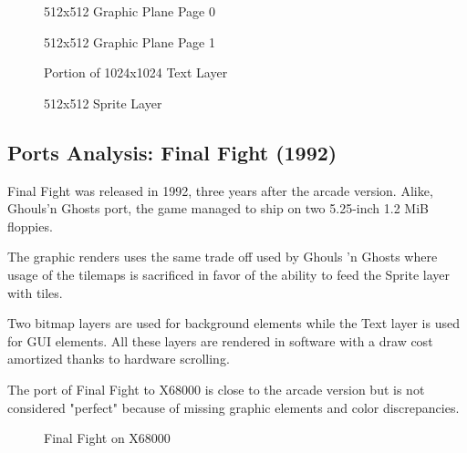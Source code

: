 \vspace{-4ex}
\begin{minipage}[t]{0.49\linewidth}
  \begin{figure}[H]
  \caption*{512x512 Graphic Plane Page 0}
  \end{figure}
\end{minipage}%
\hfill
\begin{minipage}[t]{0.49\linewidth}
  \begin{figure}[H]
  \caption*{512x512 Graphic Plane Page 1}
  \end{figure}
\end{minipage}%

\begin{minipage}[t]{0.49\linewidth}
  \begin{figure}[H]
  \caption*{Portion of 1024x1024 Text Layer}
  \end{figure}
\end{minipage}%
\hfill
\begin{minipage}[t]{0.49\linewidth}
   \begin{figure}[H]
  \caption*{512x512 Sprite Layer}
  \end{figure}
\end{minipage}%


\pagebreak

\subsection{Ports Analysis: Final Fight (1992)}

Final Fight was released in 1992, three years after the arcade version. Alike, Ghouls'n Ghosts port, the game managed to ship on two 5.25-inch 1.2 MiB floppies.

The graphic renders uses the same trade off used by Ghouls 'n Ghosts where usage of the tilemaps is sacrificed in favor of the ability to feed the Sprite layer with tiles. 

Two bitmap layers are used for background elements while the Text layer is used for GUI elements. All these layers are rendered in software with a draw cost amortized thanks to hardware scrolling.

The port of Final Fight to X68000 is close to the arcade version but is not considered "perfect" because of missing graphic elements and color discrepancies. 


\begin{figure}[H]
\caption*{Final Fight on X68000}
\end{figure}

